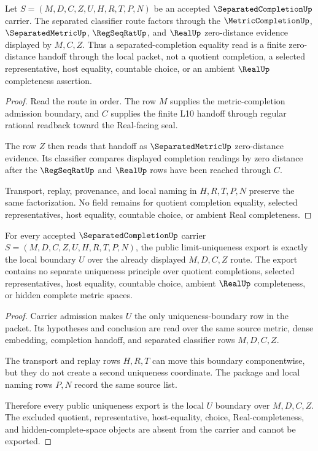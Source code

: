 \begin{theorem}
\label{thm:separatedcompletion-zero-distance-factorization}
Let $S=(M,D,C,Z,U,H,R,T,P,N)$ be an accepted $\SeparatedCompletionUp$ carrier. The separated classifier route factors through the $\MetricCompletionUp$, $\SeparatedMetricUp$, $\RegSeqRatUp$, and $\RealUp$ zero-distance evidence displayed by $M,C,Z$. Thus a separated-completion equality read is a finite zero-distance handoff through the local packet, not a quotient completion, a selected representative, host equality, countable choice, or an ambient $\RealUp$ completeness assertion.
\end{theorem}
\begin{proof}
Read the route in order. The row $M$ supplies the metric-completion admission boundary, and $C$ supplies the finite L10 handoff through regular rational readback toward the Real-facing seal.

The row $Z$ then reads that handoff as $\SeparatedMetricUp$ zero-distance evidence. Its classifier compares displayed completion readings by zero distance after the $\RegSeqRatUp$ and $\RealUp$ rows have been reached through $C$.

Transport, replay, provenance, and local naming in $H,R,T,P,N$ preserve the same factorization. No field remains for quotient completion equality, selected representatives, host equality, countable choice, or ambient Real completeness.
\end{proof}

\begin{theorem}
\label{thm:separatedcompletion-limit-uniqueness-export}
For every accepted $\SeparatedCompletionUp$ carrier $S=(M,D,C,Z,U,H,R,T,P,N)$, the public limit-uniqueness export is exactly the local boundary $U$ over the already displayed $M,D,C,Z$ route. The export contains no separate uniqueness principle over quotient completions, selected representatives, host equality, countable choice, ambient $\RealUp$ completeness, or hidden complete metric spaces.
\end{theorem}
\begin{proof}
Carrier admission makes $U$ the only uniqueness-boundary row in the packet. Its hypotheses and conclusion are read over the same source metric, dense embedding, completion handoff, and separated classifier rows $M,D,C,Z$.

The transport and replay rows $H,R,T$ can move this boundary componentwise, but they do not create a second uniqueness coordinate. The package and local naming rows $P,N$ record the same source list.

Therefore every public uniqueness export is the local $U$ boundary over $M,D,C,Z$. The excluded quotient, representative, host-equality, choice, Real-completeness, and hidden-complete-space objects are absent from the carrier and cannot be exported.
\end{proof}

